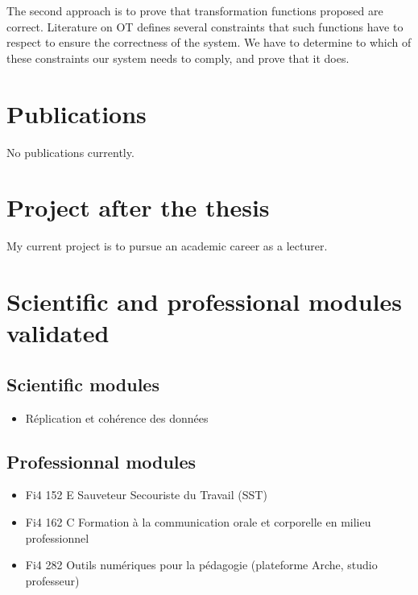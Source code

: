 \documentclass[11pt]{article}
\begin{document}
The second approach is to prove that transformation functions proposed are correct.
Literature on \ac{OT} defines several constraints that such functions have to respect
to ensure the correctness of the system.
We have to determine to which of these constraints our system needs to comply, and prove that it does.

\section*{Publications}
\hspace{1em} No publications currently.

\section*{Project after the thesis}
\hspace{1em} My current project is to pursue an academic career as a lecturer.

\section*{Scientific and professional modules validated}

\subsection*{Scientific modules}

\begin{itemize}
    \item Réplication et cohérence des données
\end{itemize}

\subsection*{Professionnal modules}

\begin{itemize}
    \item Fi4 152 E Sauveteur Secouriste du Travail (SST)
    \item Fi4 162 C Formation à la communication orale et corporelle en milieu professionnel
    \item Fi4 282 Outils numériques pour la pédagogie (plateforme Arche, studio professeur)
\end{itemize}
\end{document}
